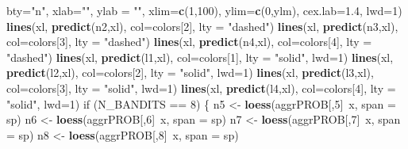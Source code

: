 \documentclass[11pt,,]{article}
\newenvironment{Shaded}{\begin{snugshade}}{\end{snugshade}}
\newcommand{\KeywordTok}[1]{\textcolor[rgb]{0.13,0.29,0.53}{\textbf{{#1}}}}
\newcommand{\DataTypeTok}[1]{\textcolor[rgb]{0.13,0.29,0.53}{{#1}}}
\newcommand{\DecValTok}[1]{\textcolor[rgb]{0.00,0.00,0.81}{{#1}}}
\newcommand{\FloatTok}[1]{\textcolor[rgb]{0.00,0.00,0.81}{{#1}}}
\newcommand{\StringTok}[1]{\textcolor[rgb]{0.31,0.60,0.02}{{#1}}}
\newcommand{\NormalTok}[1]{{#1}}
\begin{document}
\begin{Shaded}
\begin{Highlighting}[]
{{          \DataTypeTok{bty=}\StringTok{"n"}\NormalTok{, }\DataTypeTok{xlab=}\StringTok{""}\NormalTok{, }\DataTypeTok{ylab =} \StringTok{""}\NormalTok{, }\DataTypeTok{xlim=}\KeywordTok{c}\NormalTok{(}\DecValTok{1}\NormalTok{,}\DecValTok{100}\NormalTok{), }\DataTypeTok{ylim=}\KeywordTok{c}\NormalTok{(}\DecValTok{0}\NormalTok{,ylm), }
          \DataTypeTok{cex.lab=}\FloatTok{1.4}\NormalTok{,  }\DataTypeTok{lwd=}\DecValTok{1}\NormalTok{)}
    \KeywordTok{lines}\NormalTok{(xl, }\KeywordTok{predict}\NormalTok{(n2,xl), }\DataTypeTok{col=}\NormalTok{colors[}\DecValTok{2}\NormalTok{], }\DataTypeTok{lty =} \StringTok{"dashed"}\NormalTok{)}
    \KeywordTok{lines}\NormalTok{(xl, }\KeywordTok{predict}\NormalTok{(n3,xl), }\DataTypeTok{col=}\NormalTok{colors[}\DecValTok{3}\NormalTok{], }\DataTypeTok{lty =} \StringTok{"dashed"}\NormalTok{)}
    \KeywordTok{lines}\NormalTok{(xl, }\KeywordTok{predict}\NormalTok{(n4,xl), }\DataTypeTok{col=}\NormalTok{colors[}\DecValTok{4}\NormalTok{], }\DataTypeTok{lty =} \StringTok{"dashed"}\NormalTok{)}
    \KeywordTok{lines}\NormalTok{(xl, }\KeywordTok{predict}\NormalTok{(l1,xl), }\DataTypeTok{col=}\NormalTok{colors[}\DecValTok{1}\NormalTok{], }\DataTypeTok{lty =} \StringTok{"solid"}\NormalTok{, }\DataTypeTok{lwd=}\DecValTok{1}\NormalTok{)}
    \KeywordTok{lines}\NormalTok{(xl, }\KeywordTok{predict}\NormalTok{(l2,xl), }\DataTypeTok{col=}\NormalTok{colors[}\DecValTok{2}\NormalTok{], }\DataTypeTok{lty =} \StringTok{"solid"}\NormalTok{, }\DataTypeTok{lwd=}\DecValTok{1}\NormalTok{)}
    \KeywordTok{lines}\NormalTok{(xl, }\KeywordTok{predict}\NormalTok{(l3,xl), }\DataTypeTok{col=}\NormalTok{colors[}\DecValTok{3}\NormalTok{], }\DataTypeTok{lty =} \StringTok{"solid"}\NormalTok{, }\DataTypeTok{lwd=}\DecValTok{1}\NormalTok{)}
    \KeywordTok{lines}\NormalTok{(xl, }\KeywordTok{predict}\NormalTok{(l4,xl), }\DataTypeTok{col=}\NormalTok{colors[}\DecValTok{4}\NormalTok{], }\DataTypeTok{lty =} \StringTok{"solid"}\NormalTok{, }\DataTypeTok{lwd=}\DecValTok{1}\NormalTok{)}
    \NormalTok{if (N_BANDITS ==}\StringTok{ }\DecValTok{8}\NormalTok{) \{}
        \NormalTok{n5 <-}\StringTok{ }\KeywordTok{loess}\NormalTok{(aggrPROB[,}\DecValTok{5}\NormalTok{]~x, }\DataTypeTok{span =} \NormalTok{sp)}
        \NormalTok{n6 <-}\StringTok{ }\KeywordTok{loess}\NormalTok{(aggrPROB[,}\DecValTok{6}\NormalTok{]~x, }\DataTypeTok{span =} \NormalTok{sp)}
        \NormalTok{n7 <-}\StringTok{ }\KeywordTok{loess}\NormalTok{(aggrPROB[,}\DecValTok{7}\NormalTok{]~x, }\DataTypeTok{span =} \NormalTok{sp)}
        \NormalTok{n8 <-}\StringTok{ }\KeywordTok{loess}\NormalTok{(aggrPROB[,}\DecValTok{8}\NormalTok{]~x, }\DataTypeTok{span =} \NormalTok{sp)}
}}
\end{Highlighting}
\end{Shaded}
\end{document}
